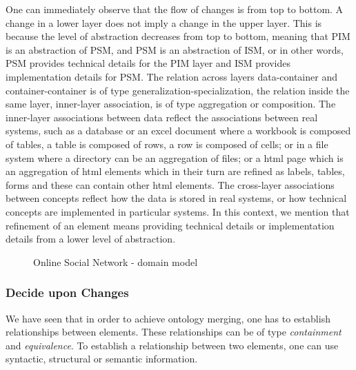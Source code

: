 \documentclass{sig-alternate}
\begin{document}
One can immediately observe that the flow of changes is from top to bottom.
A change in a lower layer does not imply a change in the upper layer.
This is because the level of abstraction decreases from top to bottom,
meaning that PIM is an abstraction of PSM, and PSM is an abstraction of ISM, 
or in other words, PSM provides technical details for the PIM layer and ISM provides implementation details for PSM.
The relation across layers data-container and container-container is of type generalization-specialization,
the relation inside the same layer, inner-layer association, is of type aggregation or composition.
The inner-layer associations between data reflect the associations between real systems,
such as a database or an excel document where a workbook is composed of tables,
a table is composed of rows, a row is composed of cells; 
or in a file system where a directory can be an aggregation of files;
or a html page which is an aggregation of html elements which in their turn are refined as labels, tables, forms and these can contain other html elements.
The cross-layer associations  between concepts reflect how the data is stored in real systems, 
or how technical concepts are implemented in particular systems. 
In this context, we mention that refinement of an element means providing technical details or implementation details from a lower level of abstraction.

\begin{figure}
\centering
{}
\caption{Online Social Network - domain model}
\label{fig:metamodel-instance}
\end{figure}

\subsubsection{Decide upon Changes}

We have seen that in order to achieve ontology merging, one has to establish relationships between elements.
These relationships can be of type \textit{containment} and \textit{equivalence}.
To establish a relationship between two elements, one can use syntactic, structural or semantic information.
\end{document}
